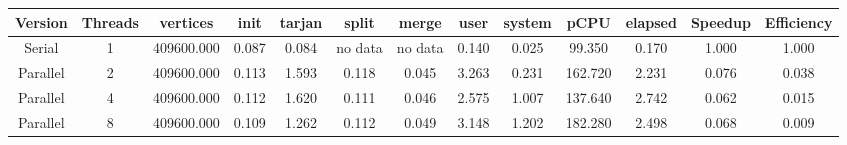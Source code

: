 \begin{tabular}{|c|c|c|c|c|c|c|c|c|c|c|c|c|}
\toprule
 Version &  Threads &   vertices &  init &  tarjan &   split &   merge &  user &  system &    pCPU &  elapsed &  Speedup &  Efficiency \\
\midrule
  Serial &        1 & 409600.000 & 0.087 &   0.084 & no data & no data & 0.140 &   0.025 &  99.350 &    0.170 &    1.000 &       1.000 \\
Parallel &        2 & 409600.000 & 0.113 &   1.593 &   0.118 &   0.045 & 3.263 &   0.231 & 162.720 &    2.231 &    0.076 &       0.038 \\
Parallel &        4 & 409600.000 & 0.112 &   1.620 &   0.111 &   0.046 & 2.575 &   1.007 & 137.640 &    2.742 &    0.062 &       0.015 \\
Parallel &        8 & 409600.000 & 0.109 &   1.262 &   0.112 &   0.049 & 3.148 &   1.202 & 182.280 &    2.498 &    0.068 &       0.009 \\
\bottomrule
\end{tabular}
